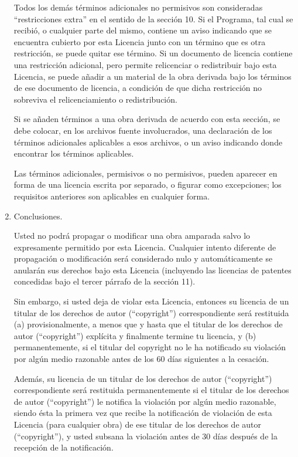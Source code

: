 \documentclass[11pt]{article}
\begin{document}
\begin{enumerate}
Todos los dem\'{a}s t\'{e}rminos adicionales no permisivos son consideradas 
``restricciones extra'' en el sentido de la secci\'{o}n 10.  Si el Programa, tal cual se 
recibi\'{o}, o cualquier parte del mismo, contiene un aviso indicando que se 
encuentra cubierto por esta Licencia junto con un t\'{e}rmino que es otra restricci\'{o}n,
se puede quitar ese t\'{e}rmino.  Si un documento de licencia contiene una restricci\'{o}n
adicional, pero permite relicenciar o redistribuir bajo esta Licencia, se puede 
a\~nadir a un material de la obra derivada bajo los t\'{e}rminos de ese documento de 
licencia, a condici\'{o}n de que dicha restricci\'{o}n no sobreviva el relicenciamiento 
o redistribuci\'{o}n.

Si se a\~naden t\'{e}rminos a una obra derivada de acuerdo con esta secci\'{o}n, se debe 
colocar, en los archivos fuente involucrados, una declaraci\'{o}n de los t\'{e}rminos adicionales aplicables a esos archivos, o un aviso indicando donde encontrar los t\'{e}rminos aplicables.

Las t\'{e}rminos adicionales, permisivos o no permisivos, pueden aparecer en forma de 
una licencia escrita por separado, o figurar como excepciones; los requisitos anteriores son aplicables en cualquier forma.

\item Conclusiones.

Usted no podr\'{a} propagar o modificar una obra amparada salvo lo
expresamente permitido por esta Licencia.  Cualquier intento
diferente de propagaci\'{o}n o modificaci\'{o}n ser\'{a} considerado nulo y
autom\'{a}ticamente se anular\'{a}n sus derechos bajo esta Licencia
(incluyendo las licencias de patentes concedidas bajo el tercer
p\'{a}rrafo de la secci\'{o}n 11).

Sin embargo, si usted deja de violar esta Licencia, entonces su
licencia de un titular de los derechos de autor (``copyright'') correspondiente ser\'{a}
restituida (a) provisionalmente, a menos que y hasta que el titular de los derechos de autor (``copyright'') expl\'{i}cita y finalmente termine tu licencia, y (b) permanentemente,
si el titular del copyright no le ha notificado su violaci\'{o}n por
alg\'{u}n medio razonable antes de los 60 d\'{i}as siguientes a la cesaci\'{o}n.

Adem\'{a}s, su licencia de un titular de los derechos de autor (``copyright'')
correspondiente ser\'{a} restituida permanentemente si el titular de los derechos de autor (``copyright'') le notifica la violaci\'{o}n por alg\'{u}n medio razonable,
siendo \'{e}sta la primera vez que recibe la notificaci\'{o}n de violaci\'{o}n de
esta Licencia (para cualquier obra) de ese titular de los derechos de autor (``copyright''), y
usted subsana la violaci\'{o}n antes de 30 d\'{i}as despu\'{e}s de la recepci\'{o}n
de la notificaci\'{o}n.


\end{enumerate}
\end{document}

